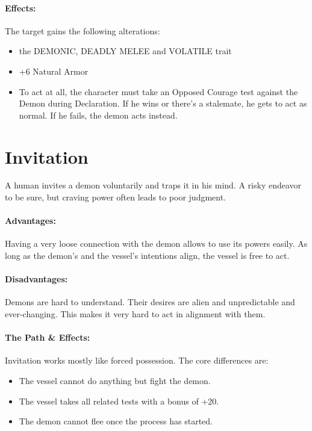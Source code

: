 \paragraph{Effects:}
The target gains the following alterations:
\begin{itemize}
	\vspace{-10mm}
	\setlength\itemsep{-10mm}
	\item the DEMONIC, DEADLY MELEE and VOLATILE trait
	\item +6 Natural Armor
	\item To act at all, the character must take an Opposed Courage test against the Demon during Declaration.
	If he wins or there's a stalemate, he gets to act as normal.
	If he fails, the demon acts instead.
\end{itemize}

\section{Invitation}
A human invites a demon voluntarily and traps it in his mind.
A risky endeavor to be sure,
but craving power often leads to poor judgment.
\paragraph{Advantages:}
Having a very loose connection with the demon allows to use its powers easily.
As long as the demon's and the vessel's intentions align,
the vessel is free to act.
\paragraph{Disadvantages:}
Demons are hard to understand.
Their desires are alien and unpredictable and ever-changing.
This makes it very hard to act in alignment with them.
\paragraph{The Path \& Effects:}
Invitation works mostly like forced possession.
The core differences are:
\begin{itemize}
	\setlength\itemsep{-8mm} \vspace{-8mm}
	\item The vessel cannot do anything but fight the demon.
	\item The vessel takes all related tests with a bonus of +20.
	\item The demon cannot flee once the process has started.
\end{itemize}

